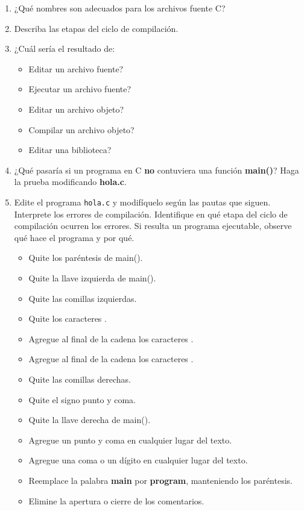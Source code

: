 \begin{enumerate}
	\item ¿Qué nombres son adecuados para los archivos fuente C? 
	\item Describa las etapas del ciclo de compilación.
	\item ¿Cuál sería el resultado de: 
		\begin{itemize}
		\item Editar un archivo fuente? 
		\item Ejecutar un archivo fuente? 
		\item Editar un archivo objeto? 
		\item Compilar un archivo objeto? 
		\item Editar una biblioteca?
		\end{itemize}
	\item ¿Qué pasaría si un programa en C \textbf{no} contuviera una función \textbf{main()}? Haga la prueba modificando \textbf{hola.c}.
	\item Edite el programa \texttt{hola.c} y modifíquelo según las pautas que siguen. Interprete los errores de compilación. Identifique en qué etapa del ciclo de compilación ocurren los errores. Si resulta un programa ejecutable, observe qué hace el programa y por qué. 
		\begin{itemize}
		\item Quite los paréntesis de main(). 
		\item Quite la llave izquierda de main().
		\item Quite las comillas izquierdas.
		\item Quite los caracteres .
		\item Agregue al final de la cadena los caracteres .
		\item Agregue al final de la cadena los caracteres .
		\item Quite las comillas derechas.
		\item Quite el signo punto y coma. 
		\item Quite la llave derecha de main().
		\item Agregue un punto y coma en cualquier lugar del texto.
		\item Agregue una coma o un dígito en cualquier lugar del texto. 
		\item Reemplace la palabra \textbf{main} por \textbf{program}, manteniendo los paréntesis. 
		\item Elimine la apertura o cierre de los comentarios.
		\end{itemize}
\end{enumerate}

